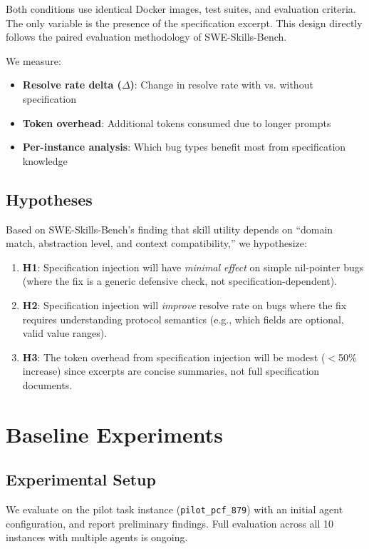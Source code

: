 \documentclass{article}
\begin{document}
Both conditions use identical Docker images, test suites, and evaluation criteria. The only variable is the presence of the specification excerpt. This design directly follows the paired evaluation methodology of SWE-Skills-Bench.

We measure:
\begin{itemize}
    \item \textbf{Resolve rate delta ($\Delta$)}: Change in resolve rate with vs. without specification
    \item \textbf{Token overhead}: Additional tokens consumed due to longer prompts
    \item \textbf{Per-instance analysis}: Which bug types benefit most from specification knowledge
\end{itemize}

\subsection{Hypotheses}

Based on SWE-Skills-Bench's finding that skill utility depends on ``domain match, abstraction level, and context compatibility,'' we hypothesize:

\begin{enumerate}
    \item \textbf{H1}: Specification injection will have \emph{minimal effect} on simple nil-pointer bugs (where the fix is a generic defensive check, not specification-dependent).
    \item \textbf{H2}: Specification injection will \emph{improve} resolve rate on bugs where the fix requires understanding protocol semantics (e.g., which fields are optional, valid value ranges).
    \item \textbf{H3}: The token overhead from specification injection will be modest ($<$50\% increase) since excerpts are concise summaries, not full specification documents.
\end{enumerate}

\section{Baseline Experiments}

\subsection{Experimental Setup}

We evaluate on the pilot task instance (\texttt{pilot\_pcf\_879}) with an initial agent configuration, and report preliminary findings. Full evaluation across all 10 instances with multiple agents is ongoing.
\end{document}

